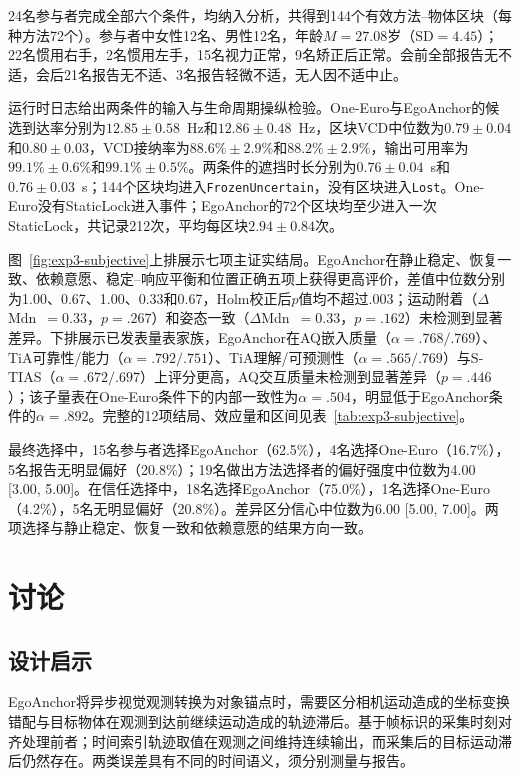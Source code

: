 \documentclass[review]{vgtc}
\begin{document}
24名参与者完成全部六个条件，均纳入分析，共得到144个有效方法--物体区块（每种方法72个）。参与者中女性12名、男性12名，年龄$M=27.08$岁（$\mathrm{SD}=4.45$）；22名惯用右手，2名惯用左手，15名视力正常，9名矫正后正常。会前全部报告无不适，会后21名报告无不适、3名报告轻微不适，无人因不适中止。

运行时日志给出两条件的输入与生命周期操纵检验。One-Euro与EgoAnchor的候选到达率分别为$12.85\pm0.58$~Hz和$12.86\pm0.48$~Hz，区块VCD中位数为$0.79\pm0.04$和$0.80\pm0.03$，VCD接纳率为$88.6\%\pm2.9\%$和$88.2\%\pm2.9\%$，输出可用率为$99.1\%\pm0.6\%$和$99.1\%\pm0.5\%$。两条件的遮挡时长分别为$0.76\pm0.04$~s和$0.76\pm0.03$~s；144个区块均进入\texttt{FrozenUncertain}，没有区块进入\texttt{Lost}。One-Euro没有StaticLock进入事件；EgoAnchor的72个区块均至少进入一次StaticLock，共记录212次，平均每区块$2.94\pm0.84$次。

图~\ref{fig:exp3-subjective}上排展示七项主证实结局。EgoAnchor在静止稳定、恢复一致、依赖意愿、稳定--响应平衡和位置正确五项上获得更高评价，差值中位数分别为1.00、0.67、1.00、0.33和0.67，Holm校正后$p$值均不超过.003；运动附着（$\Delta$Mdn~$=0.33$，$p=.267$）和姿态一致（$\Delta$Mdn~$=0.33$，$p=.162$）未检测到显著差异。下排展示已发表量表家族，EgoAnchor在AQ嵌入质量（$\alpha = .768/.769$）、TiA可靠性/能力（$\alpha = .792/.751$）、TiA理解/可预测性（$\alpha = .565/.769$）与S-TIAS（$\alpha = .672/.697$）上评分更高，AQ交互质量未检测到显著差异（$p=.446$）；该子量表在One-Euro条件下的内部一致性为$\alpha = .504$，明显低于EgoAnchor条件的$\alpha = .892$。完整的12项结局、效应量和区间见表~\ref{tab:exp3-subjective}。

最终选择中，15名参与者选择EgoAnchor（62.5\%），4名选择One-Euro（16.7\%），5名报告无明显偏好（20.8\%）；19名做出方法选择者的偏好强度中位数为4.00 [3.00, 5.00]。在信任选择中，18名选择EgoAnchor（75.0\%），1名选择One-Euro（4.2\%），5名无明显偏好（20.8\%）。差异区分信心中位数为6.00 [5.00, 7.00]。两项选择与静止稳定、恢复一致和依赖意愿的结果方向一致。



\section{讨论}\label{sec:discussion}

\subsection{设计启示}

EgoAnchor将异步视觉观测转换为对象锚点时，需要区分相机运动造成的坐标变换错配与目标物体在观测到达前继续运动造成的轨迹滞后。基于帧标识的采集时刻对齐处理前者；时间索引轨迹取值在观测之间维持连续输出，而采集后的目标运动滞后仍然存在。两类误差具有不同的时间语义，须分别测量与报告。
\end{document}
